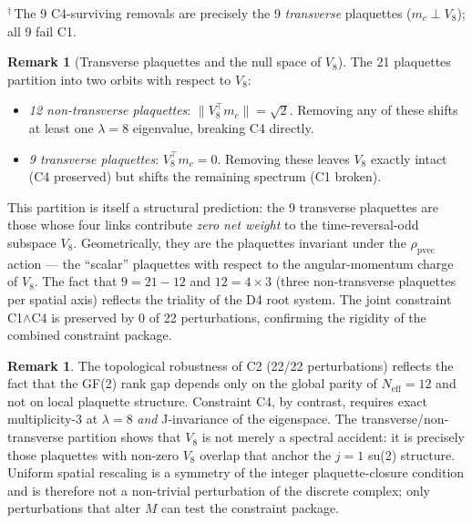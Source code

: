 \documentclass[12pt,a4paper]{article}
\theoremstyle{plain}
\theoremstyle{definition}
\newtheorem{remark}[theorem]{Remark}
\newcommand{\Neff}{N_{\mathrm{eff}}}
\begin{document}
\noindent$^\dagger$\,The 9 C4-surviving removals are precisely the 9
\emph{transverse} plaquettes ($m_c \perp V_8$); all 9 fail C1.

\begin{remark}[Transverse plaquettes and the null space of $V_8$]
\label{rem:transverse}
  The 21 plaquettes partition into two orbits with respect to $V_8$:
  \begin{itemize}[nosep]
    \item \emph{12 non-transverse plaquettes}: $\|V_8^\top m_c\| = \sqrt{2}$.
      Removing any of these shifts at least one $\lambda=8$ eigenvalue,
      breaking C4 directly.
    \item \emph{9 transverse plaquettes}: $V_8^\top m_c = 0$.
      Removing these leaves $V_8$ exactly intact (C4 preserved) but
      shifts the remaining spectrum (C1 broken).
  \end{itemize}
  This partition is itself a structural prediction: the 9 transverse
  plaquettes are those whose four links contribute \emph{zero net weight}
  to the time-reversal-odd subspace $V_8$.  Geometrically, they are the
  plaquettes invariant under the $\rho_{\mathrm{pvec}}$ action — the
  ``scalar'' plaquettes with respect to the angular-momentum charge of $V_8$.
  The fact that $9 = 21 - 12$ and $12 = 4 \times 3$ (three non-transverse
  plaquettes per spatial axis) reflects the triality of the D4 root system.
  The joint constraint C1$\wedge$C4 is preserved by 0 of 22 perturbations,
  confirming the rigidity of the combined constraint package.
\end{remark}

\begin{remark}
  The topological robustness of C2 (22/22 perturbations) reflects the fact that
  the GF(2) rank gap depends only on the global parity of $\Neff = 12$
  and not on local plaquette structure.  Constraint C4, by contrast,
  requires exact multiplicity-3 at $\lambda = 8$ \emph{and} J-invariance
  of the eigenspace.  The transverse/non-transverse partition shows that
  $V_8$ is not merely a spectral accident: it is precisely those plaquettes
  with non-zero $V_8$ overlap that anchor the $j=1$ su(2) structure.
  Uniform spatial rescaling is a symmetry of the integer plaquette-closure
  condition and is therefore not a non-trivial perturbation of the discrete
  complex; only perturbations that alter $M$ can test the constraint package.
\end{remark}

\end{document}
